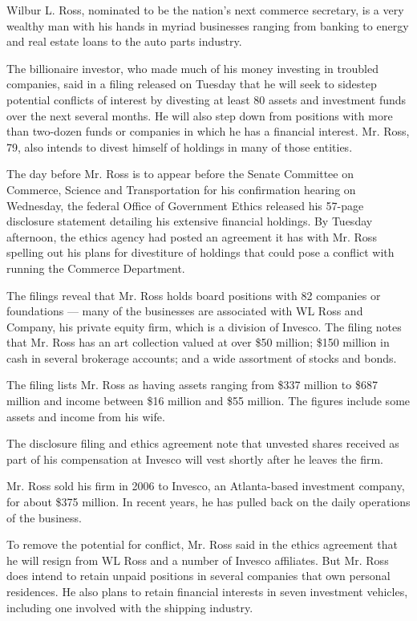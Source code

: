 Wilbur L. Ross, nominated to be the nation's next commerce secretary, is
a very wealthy man with his hands in myriad businesses ranging from
banking to energy and real estate loans to the auto parts industry.

The billionaire investor, who made much of his money investing in
troubled companies, said in a filing released on Tuesday that he will
seek to sidestep potential conflicts of interest by divesting at least
80 assets and investment funds over the next several months. He will
also step down from positions with more than two-dozen funds or
companies in which he has a financial interest. Mr. Ross, 79, also
intends to divest himself of holdings in many of those entities.

The day before Mr. Ross is to appear before the Senate Committee on
Commerce, Science and Transportation for his confirmation hearing on
Wednesday, the federal Office of Government Ethics released his 57-page
disclosure statement detailing his extensive financial holdings. By
Tuesday afternoon, the ethics agency had posted an agreement it has with
Mr. Ross spelling out his plans for divestiture of holdings that could
pose a conflict with running the Commerce Department.

The filings reveal that Mr. Ross holds board positions with 82 companies
or foundations --- many of the businesses are associated with WL Ross
and Company, his private equity firm, which is a division of Invesco.
The filing notes that Mr. Ross has an art collection valued at over \$50
million; \$150 million in cash in several brokerage accounts; and a wide
assortment of stocks and bonds.

The filing lists Mr. Ross as having assets ranging from \$337 million to
\$687 million and income between \$16 million and \$55 million. The
figures include some assets and income from his wife.

The disclosure filing and ethics agreement note that unvested shares
received as part of his compensation at Invesco will vest shortly after
he leaves the firm.

Mr. Ross sold his firm in 2006 to Invesco, an Atlanta-based investment
company, for about \$375 million. In recent years, he has pulled back on
the daily operations of the business.

To remove the potential for conflict, Mr. Ross said in the ethics
agreement that he will resign from WL Ross and a number of Invesco
affiliates. But Mr. Ross does intend to retain unpaid positions in
several companies that own personal residences. He also plans to retain
financial interests in seven investment vehicles, including one involved
with the shipping industry.

